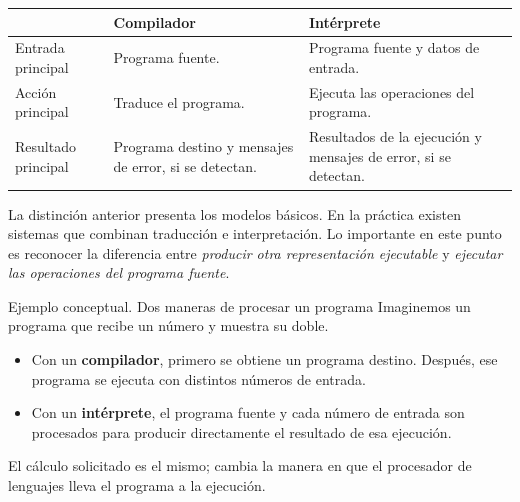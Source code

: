 \documentclass[11pt,spanish]{article}
\providecommand{\tabularnewline}{\\}
\begin{document}
\begin{center}
\end{center}

\begin{center}
\renewcommand{\arraystretch}{1.2}
\begin{tabular}{|p{}|p{}|p{}|}
\hline
 & \textbf{Compilador} & \textbf{Intérprete} \tabularnewline
\hline
Entrada principal & Programa fuente. & Programa fuente y datos de entrada. \tabularnewline
\hline
Acción principal & Traduce el programa. & Ejecuta las operaciones del programa. \tabularnewline
\hline
Resultado principal & Programa destino y mensajes de error, si se detectan. & Resultados de la ejecución y mensajes de error, si se detectan. \tabularnewline
\hline
\end{tabular}
\end{center}

La distinción anterior presenta los modelos básicos. En la práctica existen sistemas que combinan traducción e interpretación. Lo importante en este punto es reconocer la diferencia entre \emph{producir otra representación ejecutable} y \emph{ejecutar las operaciones del programa fuente}.

\begin{ejemplo}{Ejemplo conceptual. Dos maneras de procesar un programa}
Imaginemos un programa que recibe un número y muestra su doble.

\begin{itemize}
    \item Con un \textbf{compilador}, primero se obtiene un programa destino. Después, ese programa se ejecuta con distintos números de entrada.
    \item Con un \textbf{intérprete}, el programa fuente y cada número de entrada son procesados para producir directamente el resultado de esa ejecución.
\end{itemize}

El cálculo solicitado es el mismo; cambia la manera en que el procesador de lenguajes lleva el programa a la ejecución.
\end{ejemplo}
\end{document}
